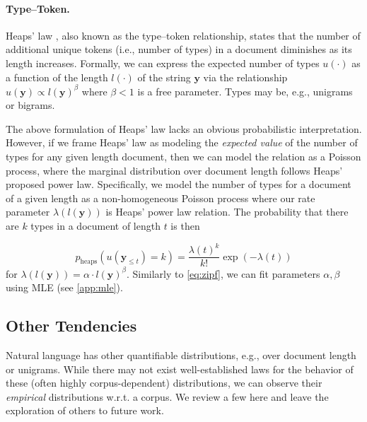 \documentclass[11pt,a4paper]{article}
\newcommand{\unique}{u}
\newcommand{\calC}{\mathcal{C}}
\newcommand{\yy}{\mathbf{y}}
\newcommand{\mathcheck}[1]{#1}
\begin{document}
\paragraph{Type--Token.}\label{sec:heaps}
Heaps' law \cite{heaps}, also known as the type--token relationship, states that the number of additional unique tokens (i.e., number of types) in a document diminishes as its length increases. Formally, we can express the expected number of types $\unique(\cdot)$ as a function of the length $l(\cdot)$ of the string $\yy$ via the relationship \mathcheck{$\unique(\yy) \propto l(\yy)^\beta$} where $\beta < 1$ is a free parameter. Types may be, e.g., unigrams or bigrams.

The above formulation of Heaps' law lacks an obvious probabilistic interpretation. However, if we frame Heaps' law as modeling the \emph{expected value} of the number of types for any given length document, then we can model the relation as a Poisson process, where the marginal distribution over document length follows Heaps' proposed power law. Specifically, we model the number of types for a document of a given length as a non-homogeneous Poisson process \cite[NHPP;][]{ross1996stochastic} where our rate parameter $\lambda(l(\yy))$ is  Heaps' power law relation. The probability that there are $k$ types in a document of length $t$ is then
\mathcheck{
\begin{equation}\label{eq:nhpp}
    p_\mathrm{heaps}(u(\yy_{\leq t}) = k) = \frac{\lambda(t)^k}{k!}\exp(-\lambda(t))
\end{equation}}
\noindent for \mathcheck{$\lambda(l(\yy)) = \alpha\cdot l(\yy)^\beta$}. Similarly to \cref{eq:zipf}, we can fit parameters $\alpha,\beta$ using MLE (see \cref{app:mle}).




\subsection{Other Tendencies}
Natural language has other quantifiable distributions, e.g., over document length or unigrams. %
While there may not exist well-established laws for the behavior of these (often highly corpus-dependent) distributions, we can observe their \emph{empirical} distributions w.r.t. a corpus. We review a few here and leave the exploration of others to future work.%
\end{document}
